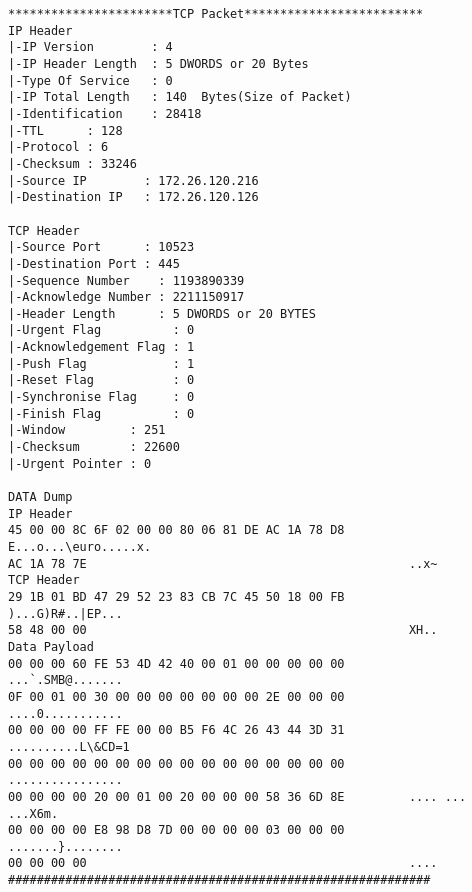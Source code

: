 \begin{lstlisting}[caption={TCP Data Package},label={lst:data_dump},mathescape]
***********************TCP Packet*************************
IP Header
|-IP Version        : 4
|-IP Header Length  : 5 DWORDS or 20 Bytes
|-Type Of Service   : 0
|-IP Total Length   : 140  Bytes(Size of Packet)
|-Identification    : 28418
|-TTL      : 128
|-Protocol : 6
|-Checksum : 33246
|-Source IP        : 172.26.120.216
|-Destination IP   : 172.26.120.126

TCP Header
|-Source Port      : 10523
|-Destination Port : 445
|-Sequence Number    : 1193890339
|-Acknowledge Number : 2211150917
|-Header Length      : 5 DWORDS or 20 BYTES
|-Urgent Flag          : 0
|-Acknowledgement Flag : 1
|-Push Flag            : 1
|-Reset Flag           : 0
|-Synchronise Flag     : 0
|-Finish Flag          : 0
|-Window         : 251
|-Checksum       : 22600
|-Urgent Pointer : 0

DATA Dump                         
IP Header
45 00 00 8C 6F 02 00 00 80 06 81 DE AC 1A 78 D8         E...o...\euro.....x.
AC 1A 78 7E                                             ..x~
TCP Header
29 1B 01 BD 47 29 52 23 83 CB 7C 45 50 18 00 FB         )...G)R#..|EP...
58 48 00 00                                             XH..
Data Payload
00 00 00 60 FE 53 4D 42 40 00 01 00 00 00 00 00         ...`.SMB@.......
0F 00 01 00 30 00 00 00 00 00 00 00 2E 00 00 00         ....0...........
00 00 00 00 FF FE 00 00 B5 F6 4C 26 43 44 3D 31         ..........L\&CD=1
00 00 00 00 00 00 00 00 00 00 00 00 00 00 00 00         ................
00 00 00 00 20 00 01 00 20 00 00 00 58 36 6D 8E         .... ... ...X6m.
00 00 00 00 E8 98 D8 7D 00 00 00 00 03 00 00 00         .......}........
00 00 00 00                                             ....
###########################################################
\end{lstlisting}